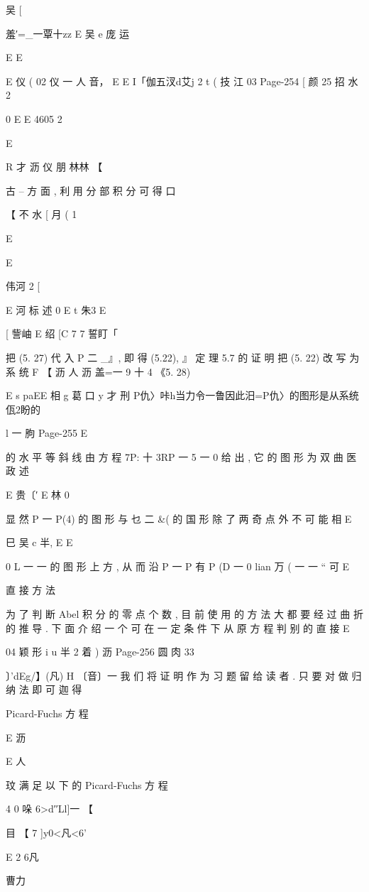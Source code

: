 {{{{{{{{{{{{{{吴
[

羞′=_一覃十zz E 吴 e 庞 运

E
E

E 仪 ( 02 仪 一 人 音， E
E I「伽五汊d艾j 2 t ( 技 江 03
Page-254
[ 颜 25 招 水 2

0
E E
4605 2

E

R 才 沥 仪 朋
林林
【

古 -- 方 面 , 利 用 分 部 积 分 可 得
口

【 不 水
[ 月 ( 1

E

E

{ 伟河 2
[

E 河 标 述 0
E
t 朱3
E

[ 訾岫 E 绍
[C 7 7 誓盯「

把 (5. 27) 代 入 P 二 _』, 即 得 (5.22), 』
定 理 5.7 的 证 明 把 (5. 22) 改 写 为 系 统
F 【 沥 人 沥 盖=一 9 十 4 《5. 28)

E s paEE 相 g 葛 口 y 才 刑
P仇〉咔h当力令一鲁因此汨=P仇〉的图形是从系统佤2盼的

l 一 朐
Page-255
E

的 水 平 等 斜 线 由 方 程 7P: 十 3RP 一 5 一 0 给 出 , 它 的 图 形 为 双 曲
医 政 述

E 贵〔′ E 林 0

显 然 P 一 P(4) 的 图 形 与 乜 二 &( 的 国 形 除 了 两 奇 点 外 不 可 能 相
E

巳 吴 c 半,
E E

0
L 一 一
的 图 形 上 方 , 从 而 沿 P 一 P 有 P (D 一 0 lian 万 ( 一 一 “ 可
E

直 接 方 法

为 了 判 断 Abel 积 分 的 零 点 个 数 , 目 前 使 用 的 方 法 大 都 要 经 过
曲 折 的 推 导 . 下 面 介 绍 一 个 可 在 一 定 条 件 下 从 原 方 程 判 别 的 直 接
E

04 颖 形 i u 半 2 着 ) 沥
Page-256
圆 肉 33

〕'dEg/】(凡) H 〔音〕一
我 们 将 证 明 作 为 习 题 留 给 读 者 . 只 要 对 做 归 纳 法 即 可 迦 得

Picard-Fuchs 方 程

E 沥

E 人

玟
满 足 以 下 的 Picard-Fuchs 方 程

4
0
哚 6>d′′Ll]一 【

目
【 7 ]y0<凡<6'

E 2
6凡

曹力

}}}}}}}}}}}}}}}
